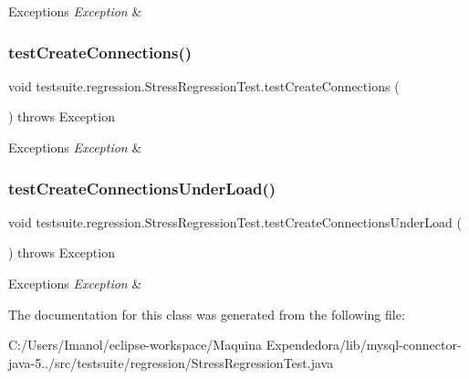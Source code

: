 \begin{DoxyExceptions}{Exceptions}
{\em Exception} & \\
\hline
\end{DoxyExceptions}
\mbox{\label{classtestsuite_1_1regression_1_1_stress_regression_test_a8253fc7fb64e884132640398b2bc5aed}} 
\subsubsection{\texorpdfstring{test\+Create\+Connections()}{testCreateConnections()}}
{\footnotesize\ttfamily void testsuite.\+regression.\+Stress\+Regression\+Test.\+test\+Create\+Connections (\begin{DoxyParamCaption}{ }\end{DoxyParamCaption}) throws Exception}


\begin{DoxyExceptions}{Exceptions}
{\em Exception} & \\
\hline
\end{DoxyExceptions}
\mbox{\label{classtestsuite_1_1regression_1_1_stress_regression_test_a1aff86540d35db22db56f48ffeb64b9d}} 
\subsubsection{\texorpdfstring{test\+Create\+Connections\+Under\+Load()}{testCreateConnectionsUnderLoad()}}
{\footnotesize\ttfamily void testsuite.\+regression.\+Stress\+Regression\+Test.\+test\+Create\+Connections\+Under\+Load (\begin{DoxyParamCaption}{ }\end{DoxyParamCaption}) throws Exception}


\begin{DoxyExceptions}{Exceptions}
{\em Exception} & \\
\hline
\end{DoxyExceptions}


The documentation for this class was generated from the following file\+:\begin{DoxyCompactItemize}
\item 
C\+:/\+Users/\+Imanol/eclipse-\/workspace/\+Maquina Expendedora/lib/mysql-\/connector-\/java-\/5../src/testsuite/regression/Stress\+Regression\+Test.\+java\end{DoxyCompactItemize}
